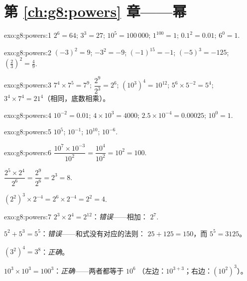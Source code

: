 \section*{第 \ref{ch:g8:powers} 章——幂}

\begin{solution}{exo:g8:powers:1}
$2^6 = 64$; \quad $3^3 = 27$; \quad $10^5 = 100\,000$; \quad
$1^{100} = 1$; \quad $0.1^2 = 0.01$; \quad $6^0 = 1$.
\end{solution}

\begin{solution}{exo:g8:powers:2}
$(-3)^2 = 9$; \quad $-3^2 = -9$; \quad $(-1)^{15} = -1$; \quad
$(-5)^3 = -125$; \quad $\left(\frac23\right)^2 = \frac49$.
\end{solution}

\begin{solution}{exo:g8:powers:3}
$7^4 \times 7^5 = 7^9$; \quad
$\dfrac{2^9}{2^3} = 2^6$; \quad
$\left(10^3\right)^4 = 10^{12}$; \quad
$5^6 \times 5^{-2} = 5^4$; \quad
$3^4 \times 7^4 = 21^4$（相同，底数相乘）。
\end{solution}

\begin{solution}{exo:g8:powers:4}
$10^{-2} = 0.01$; \quad
$4 \times 10^3 = 4000$; \quad
$2.5 \times 10^{-4} = 0.00025$; \quad
$10^0 = 1$.
\end{solution}

\begin{solution}{exo:g8:powers:5}
$10^5$; \quad $10^{-1}$; \quad $10^{10}$; \quad $10^{-6}$.
\end{solution}

\begin{solution}{exo:g8:powers:6}
$\dfrac{10^7 \times 10^{-3}}{10^2} = \dfrac{10^4}{10^2} = 10^2 =
100$.

$\dfrac{2^5 \times 2^4}{2^6} = \dfrac{2^9}{2^6} = 2^3 = 8$.

$\left(2^2\right)^3 \times 2^{-4} = 2^6 \times 2^{-4} = 2^2 = 4$.
\end{solution}

\begin{solution}{exo:g8:powers:7}
$2^3 \times 2^4 = 2^{12}$：\emph{错误}——相加：
$2^7$.

$5^2 + 5^3 = 5^5$：\emph{错误}——和式没有对应的法则：
$25 + 125 = 150$，而 $5^5 = 3125$。

$(3^2)^4 = 3^8$：\emph{正确}。

$10^3 \times 10^3 = 100^3$：\emph{正确}——两者都等于 $10^6$
（左边：$10^{3+3}$；右边：$(10^2)^3$）。
\end{solution}

